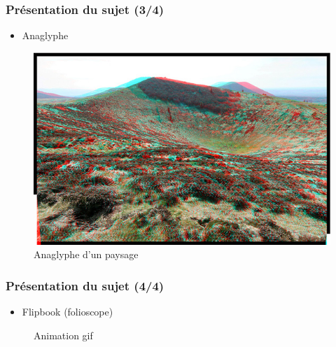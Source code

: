 \documentclass{beamer}
\begin{document}
\begin{frame}

\frametitle{Présentation du sujet (3/4)}

\begin{itemize}[label=$\bullet$]
\item Anaglyphe
\end{itemize}
\begin{figure}
\centering
\includegraphics[scale=0.4]{anaglyphe-cratere-puy.jpg} %
\caption{Anaglyphe d'un paysage \footnotemark}
\end{figure}

\end{frame}




\begin{frame}

\frametitle{Présentation du sujet (4/4)}

\begin{itemize}[label=$\bullet$]
\item Flipbook (folioscope)
\end{itemize}
\begin{figure}
\centering
{}
\caption{Animation gif\footnotemark}
\end{figure}
\end{frame}
\end{document}
